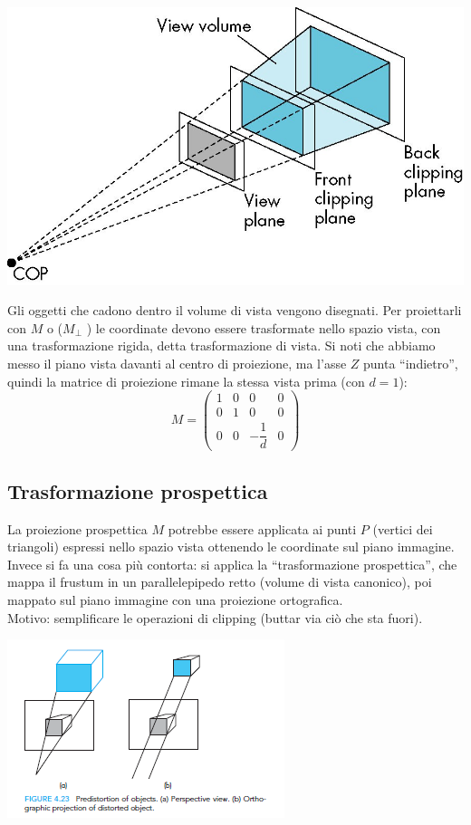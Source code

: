 \documentclass[a4paper, 10pt]{article}
\begin{document}
		\begin{center}
			\includegraphics[scale=0.15]{pipelineg4}
		\end{center}
		Gli oggetti che cadono dentro il volume di vista vengono disegnati. Per proiettarli con $ M $ o ($ M_{\perp} $ ) le coordinate devono essere trasformate nello spazio vista, con una trasformazione rigida, detta trasformazione di vista. Si noti che abbiamo messo il piano vista davanti al centro di proiezione, ma l’asse $ Z $ punta “indietro”, quindi la matrice di proiezione rimane la stessa vista prima (con $ d = 1 $):
		\[
			M =
			\begin{pmatrix}
				1 & 0 & 0 & 0 \\
				0 & 1 & 0 & 0 \\
				0 & 0 & -\dfrac{1}{d} & 0
			\end{pmatrix}
		\]
	
	
	\subsection{Trasformazione prospettica}
		\begin{multicols}{2}
			La proiezione prospettica $ M $ potrebbe essere applicata ai punti $ P $ (vertici dei triangoli) espressi nello spazio vista ottenendo le coordinate sul piano immagine.
			Invece si fa una cosa più contorta: si applica la “trasformazione prospettica”, che mappa il frustum in un parallelepipedo retto (volume di vista canonico), poi mappato sul piano immagine con una proiezione ortografica. \\
			Motivo: semplificare le operazioni di clipping (buttar via ciò che sta fuori).
			
			\columnbreak
			
			\begin{center}
				\includegraphics[scale=0.6]{pipelineg5}
			\end{center}
			
		\end{multicols}
	
\end{document}
